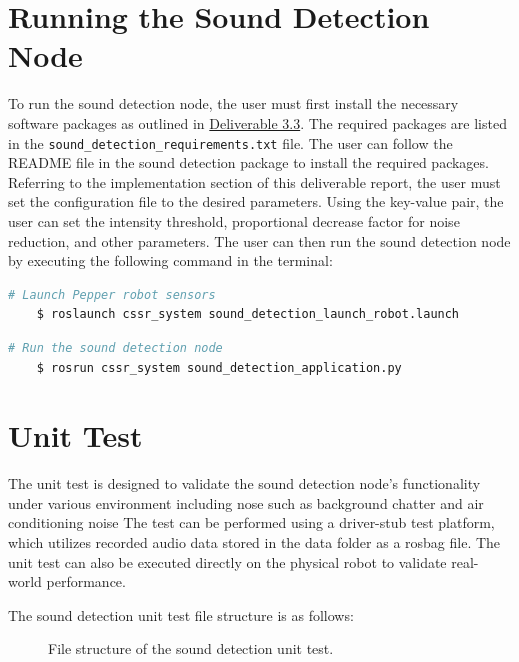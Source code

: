 \documentclass{CSSRforAfrica}
\begin{document}
\section{Running the Sound Detection Node}
To run the sound detection node, the user must first install the necessary software packages as outlined in 
\href{https://cssr4africa.github.io/deliverables/CSSR4Africa_Deliverable_D3.3.pdf}{Deliverable 3.3}. The required packages
are listed in the {\small\texttt{sound\_detection\_requirements.txt}} file. The user can follow the README file in the sound detection
package to install the required packages. Referring to the implementation section of this deliverable report, the user must 
set the configuration file to the desired parameters. Using the key-value pair, the user can set the intensity threshold, proportional decrease factor for noise reduction, and other parameters. The user can then run the sound detection node by executing the following 
command in the terminal:

\begin{lstlisting}[style=withoutNumbering, language=bash]
	# Launch Pepper robot sensors 
	$ roslaunch cssr_system sound_detection_launch_robot.launch
\end{lstlisting}

\begin{lstlisting}[style=withoutNumbering, language=bash]
	# Run the sound detection node
	$ rosrun cssr_system sound_detection_application.py
\end{lstlisting}

\newpage
\section{Unit Test}
The unit test is designed to validate the sound detection node's functionality under various environment including nose such as background chatter and air conditioning noise  
The test can be performed using a driver-stub test platform, which utilizes recorded audio data stored in the data folder as a rosbag file. The unit test can also 
be executed directly on the physical robot to validate real-world performance. 

The sound detection unit test file structure is as follows: 

\begin{figure}[h]	
	\renewcommand*\DTstyle{\ttfamily}
	\caption{File structure of the sound detection unit test.}
	\label{fig:sound_detection_unit_test}
\end{figure}
\end{document}
